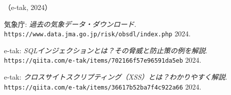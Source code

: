 \documentclass{ltjsarticle} %
\begin{document}
（e-tak, 2024）


\begin{thebibliography}{99} %
    
  気象庁: 
  \emph{過去の気象データ・ダウンロード}. \\
  \verb|https://www.data.jma.go.jp/risk/obsdl/index.php|  2024. 

  e-tak: 
  \emph{SQLインジェクションとは？その脅威と防止策の例を解説}. \\
  \verb|https://qiita.com/e-tak/items/702166f57e96591da5eb|  2024. 

  e-tak: 
  \emph{クロスサイトスクリプティング（XSS）とは？わかりやすく解説}. \\
  \verb|https://qiita.com/e-tak/items/36617b52ba7f4c922a66|  2024. 

\end{thebibliography}
\end{document}

